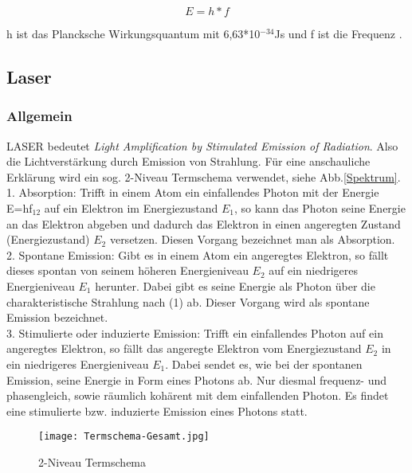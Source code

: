 \documentclass{article}
\begin{document}
\begin{center}
\begin{equation}
E = h * f
\end{equation}
\end{center}
h ist das Plancksche Wirkungsquantum mit 6,63*10$^{-34}$Js und f ist die Frequenz \cite{WulfLange,Gerthsen}. 


\subsection{Laser}
\subsubsection{Allgemein}
LASER bedeutet \emph{Light Amplification by Stimulated Emission of Radiation}.
Also die Lichtverstärkung durch Emission von Strahlung. 
Für eine anschauliche Erklärung wird ein sog. 2-Niveau Termschema verwendet, siehe Abb.\ref{Spektrum}.
\\[1em]
1. Absorption:\newline
Trifft in einem Atom ein einfallendes Photon mit der Energie E=hf$_{12}$ auf ein Elektron im Energiezustand $E_1$, so kann das Photon seine Energie an das Elektron abgeben und dadurch das Elektron in einen angeregten Zustand (Energiezustand) $E_2$ versetzen. 
Diesen Vorgang bezeichnet man als Absorption.
\\[1em]
2. Spontane Emission:\newline
Gibt es in einem Atom ein angeregtes Elektron, so fällt dieses spontan von seinem höheren Energieniveau $E_2$ auf ein niedrigeres Energieniveau $E_1$ herunter. 
Dabei gibt es seine Energie als Photon über die charakteristische Strahlung nach (1) ab.
Dieser Vorgang wird als spontane Emission bezeichnet.
\\[1em]
3. Stimulierte oder induzierte Emission:\newline
Trifft ein einfallendes Photon auf ein angeregtes Elektron, so fällt das angeregte Elektron vom Energiezustand $E_2$ in ein niedrigeres Energieniveau $E_1$.
Dabei sendet es, wie bei der spontanen Emission, seine Energie in Form eines Photons ab. 
Nur diesmal frequenz- und phasengleich, sowie räumlich kohärent mit dem einfallenden Photon.
Es findet eine stimulierte bzw. induzierte Emission eines Photons statt.
\begin{figure}[!ht]
	\centering
	\texttt{[image: Termschema-Gesamt.jpg]}
	\caption{2-Niveau Termschema \cite{Eichler}}
	\label{StimulierteEmission}
\end{figure}
\\[1em]
\end{document}
